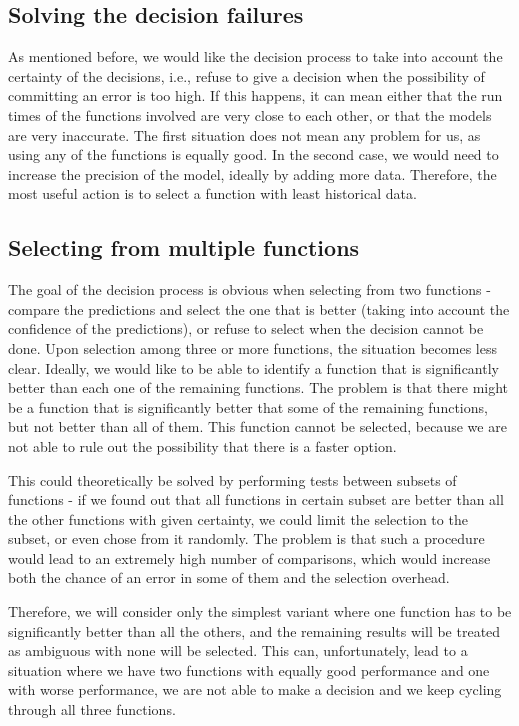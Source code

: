 \subsection{Solving the decision failures}
\label{subsec:solving_decision_failures}

As mentioned before, we would like the decision process to take into account the certainty of the decisions, i.e., refuse to give a decision when the possibility of committing an error is too high. If this happens, it can mean either that the run times of the functions involved are very close to each other, or that the models are very inaccurate. The first situation does not mean any problem for us, as using any of the functions is equally good. In the second case, we would need to increase the precision of the model, ideally by adding more data. Therefore, the most useful action is to select a function with least historical data. 

\subsection{Selecting from multiple functions}

The goal of the decision process is obvious when selecting from two functions - compare the predictions and select the one that is better (taking into account the confidence of the predictions), or refuse to select when the decision cannot be done. Upon selection among three or more functions, the situation becomes less clear. Ideally, we would like to be able to identify a function that is significantly better than each one of the remaining functions. The problem is that there might be a function that is significantly better that some of the remaining functions, but not better than all of them. This function cannot be selected, because we are not able to rule out the possibility that there is a faster option.

This could theoretically be solved by performing tests between subsets of functions - if we found out that all functions in certain subset are better than all the other functions with given certainty, we could limit the selection to the subset, or even chose from it randomly. The problem is that such a procedure would lead to an extremely high number of comparisons, which would increase both the chance of an error in some of them and the selection overhead.

Therefore, we will consider only the simplest variant where one function has to be significantly better than all the others, and the remaining results will be treated as ambiguous with none will be selected. This can, unfortunately, lead to a situation where we have two functions with equally good performance and one with worse performance, we are not able to make a decision and we keep cycling through all three functions.

